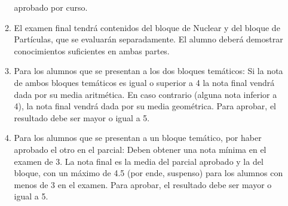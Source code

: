 \documentclass[a4paper,12pt,twoside]{article}
\begin{document}
\begin{itemize}
\begin{enumerate}[label=\alph*)]
aprobado por curso.
\item El examen final tendrá contenidos del bloque de Nuclear y del bloque de Partículas, que se
evaluarán separadamente. El alumno deberá demostrar conocimientos suficientes en ambas
partes.
\item Para los alumnos que se presentan a los dos bloques temáticos: Si la nota de ambos bloques
temáticos es igual o superior a 4 la nota final vendrá dada por su media aritmética. En caso
contrario (alguna nota inferior a 4), la nota final vendrá dada por su media geométrica. Para
aprobar, el resultado debe ser mayor o igual a 5.
\item Para los alumnos que se presentan a un bloque temático, por haber aprobado el otro en el parcial: Deben obtener una nota mínima en el examen de 3. La nota final es la media del parcial aprobado y la del bloque, con un máximo de 4.5 (por ende, suspenso) para los alumnos con menos de 3 en el examen. Para aprobar, el resultado debe ser mayor o igual a 5. 
\end{enumerate}
\end{itemize}
\end{document}
